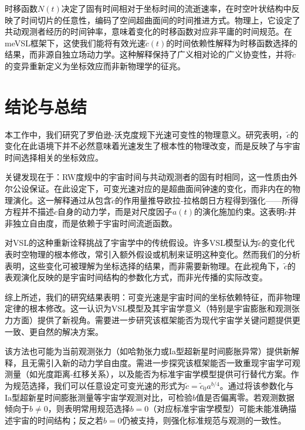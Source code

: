 \documentclass[jkps,preprint,fleqn]{revtex4}
\newcommand{\tc}{\tilde{c}}
\begin{document}
时移函数$N(t)$决定了固有时间相对于坐标时间的流逝速率，在时空叶状结构中反映了时间切片的任意性，编码了空间超曲面间的时间推进方式。物理上，它设定了共动观测者经历的时间钟率，意味着变化的时移函数对应非平庸的时间规范。在meVSL框架下，这使我们能将有效光速$\tc(t)$的时间依赖性解释为时移函数选择的结果，而非源自独立场动力学。这种解释保持了广义相对论的广义协变性，并将$\tc$的变异重新定义为坐标效应而非新物理学的征兆。
\section{结论与总结}\label{sec:Conc}
本工作中，我们研究了罗伯逊-沃克度规下光速可变性的物理意义。研究表明，$\tc$的变化在此语境下并不必然意味着光速发生了根本性的物理改变，而是反映了与宇宙时间选择相关的坐标效应。

关键发现在于：RW度规中的宇宙时间与共动观测者的固有时相同，这一性质由外尔公设保证。在此设定下，可变光速对应的是超曲面间钟速的变化，而非内在的物理演化。这一解释通过从包含$\tc$的作用量推导欧拉-拉格朗日方程得到强化——所得方程并不描述$c$自身的动力学，而是对尺度因子$a(t)$的演化施加约束。这表明$\tc$并非独立自由度，而是依赖于宇宙时间流逝函数。

对VSL的这种重新诠释挑战了宇宙学中的传统假设。许多VSL模型认为$\tc$的变化代表时空物理的根本修改，常引入额外假设或机制来证明这种变化。然而我们的分析表明，这些变化可被理解为坐标选择的结果，而非需要新物理。在此视角下，$\tc$的表观演化反映的是宇宙时间结构的参数化方式，而非光传播的实际改变。

综上所述，我们的研究结果表明：可变光速是宇宙时间的坐标依赖特征，而非物理定律的根本修改。这一认识为VSL模型及其宇宙学意义（特别是宇宙膨胀和观测张力方面）提供了新视角。需要进一步研究该框架能否为现代宇宙学关键问题提供更一致、更自然的解决方案。

该方法也可能为当前观测张力（如哈勃张力或Ia型超新星时间膨胀异常）提供新解释，且无需引入新的动力学自由度。需进一步探究该框架能否一致重现宇宙学可观测量（如光度距离-红移关系），以及能否为标准宇宙学模型提供可行替代方案。作为规范选择，我们可以任意设定可变光速的形式为$\tc = \tc_0 a^{b/4}$。通过将该参数化与Ia型超新星时间膨胀测量等宇宙学观测对比，可检验$b$值是否偏离零。若观测数据倾向于$b \neq 0$，则表明常用规范选择$b = 0$（对应标准宇宙学模型）可能未能准确描述宇宙的时间结构；反之若$b = 0$仍被支持，则强化标准规范与观测的一致性。
\end{document}
